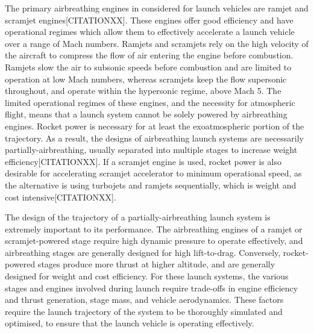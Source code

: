   	The primary airbreathing engines in considered for launch vehicles are ramjet and scramjet engines[CITATIONXX]. These engines offer good efficiency and have operational regimes which allow them to effectively accelerate a launch vehicle over a range of Mach numbers. 
  	Ramjets and scramjets rely on the high velocity of the aircraft to compress the flow of air entering the engine before combustion.  Ramjets slow the air to subsonic speeds before combustion and are limited to operation at low Mach numbers, whereas scramjets keep the flow supersonic throughout, and operate within the hypersonic regime, above Mach 5. 
  	The limited operational regimes of these engines, and the necessity for atmospheric flight, means that a launch system cannot be solely powered by airbreathing engines. Rocket power is necessary for at least the exoatmospheric portion of the trajectory. As a result, the designs of airbreathing launch systems are necessarily partially-airbreathing, usually separated into multiple stages to increase weight efficiency[CITATIONXX]. If a scramjet engine is used, rocket power is also desirable for accelerating scramjet accelerator to minimum operational speed, as the alternative is using turbojets and ramjets sequentially, which is weight and cost intensive[CITATIONXX]. 
  	
  	 
  	 The design of the trajectory of a partially-airbreathing launch system is extremely important to its performance. 
  	   The airbreathing engines of a ramjet or scramjet-powered stage require high dynamic pressure to operate effectively, and airbreathing stages are generally designed for high lift-to-drag. Conversely, rocket-powered stages produce more thrust at higher altitude, and are generally designed for weight and cost efficiency. For these launch systems, the various stages and engines involved during launch require trade-offs in engine efficiency and thrust generation, stage mass, and vehicle aerodynamics. These factors require the launch trajectory of the system to be thoroughly simulated and optimised, to ensure that the launch vehicle is operating effectively. 
 	  

